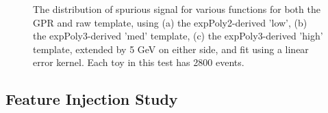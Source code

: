 \begin{figure} 
\begin{center}

\caption{The distribution of spurious signal for various functions for both the GPR and raw template, using (a) the expPoly2-derived 'low', (b) the expPoly3-derived 'med' template, (c) the expPoly3-derived 'high' template, extended by 5 GeV on either side, and fit using a linear error kernel. Each toy in this test has 2800 events.}
\label{fig:linearkernel_lowpt_2800_noSig}
\end{center}
\end{figure}

\clearpage


\subsection{Feature Injection Study}

